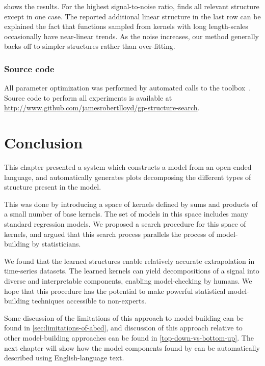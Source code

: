  shows the results.
For the highest signal-to-noise ratio, \procedurename{} finds all relevant structure except in one case.
The reported additional linear structure in the last row can be explained the fact that functions sampled from \kSE{} kernels with long length-scales occasionally have near-linear trends.
As the noise increases, our method generally backs off to simpler structures rather than over-fitting.

\subsubsection{Source code}
All \gp{} parameter optimization was performed by automated calls to the \GPML{} toolbox~\citep{GPML}.
Source code to perform all experiments is available at \url{http://www.github.com/jamesrobertlloyd/gp-structure-search}.




\section{Conclusion}

This chapter presented a system which constructs a model from an open-ended language, and automatically generates plots decomposing the different types of structure present in the model.

This was done by introducing a space of kernels defined by sums and products of a small number of base kernels.  
The set of models in this space includes many standard regression models.
We proposed a search procedure for this space of kernels, and argued that this search process parallels the process of model-building by statisticians.

We found that the learned structures enable relatively accurate extrapolation in time-series datasets. %
The learned kernels can yield decompositions of a signal into diverse and interpretable components, enabling model-checking by humans.
We hope that this procedure has the potential to make powerful statistical model-building techniques accessible to non-experts.

Some discussion of the limitations of this approach to model-building can be found in \cref{sec:limitations-of-abcd}, and discussion of this approach relative to other model-building approaches can be found in \cref{top-down-vs-bottom-up}.
The next chapter will show how the model components found by \procedurename{} can be automatically described using English-language text.




